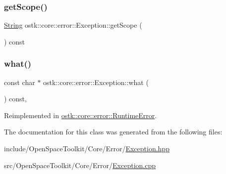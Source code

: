 \subsubsection{\texorpdfstring{get\+Scope()}{getScope()}}
{\footnotesize\ttfamily \hyperlink{classostk_1_1core_1_1types_1_1_string}{String} ostk\+::core\+::error\+::\+Exception\+::get\+Scope (\begin{DoxyParamCaption}{ }\end{DoxyParamCaption}) const}

\mbox{\label{classostk_1_1core_1_1error_1_1_exception_ae34ebc20a97277da6e2472b6bb8e3812}} 
\subsubsection{\texorpdfstring{what()}{what()}}
{\footnotesize\ttfamily const char $\ast$ ostk\+::core\+::error\+::\+Exception\+::what (\begin{DoxyParamCaption}{ }\end{DoxyParamCaption}) const\hspace{0.3cm}{\ttfamily [virtual]}, {\ttfamily [noexcept]}}



Reimplemented in \hyperlink{classostk_1_1core_1_1error_1_1_runtime_error_a671d71ab5483eaa1ce5cc3400747ded1}{ostk\+::core\+::error\+::\+Runtime\+Error}.



The documentation for this class was generated from the following files\+:\begin{DoxyCompactItemize}
\item 
include/\+Open\+Space\+Toolkit/\+Core/\+Error/\hyperlink{_exception_8hpp}{Exception.\+hpp}\item 
src/\+Open\+Space\+Toolkit/\+Core/\+Error/\hyperlink{_exception_8cpp}{Exception.\+cpp}\end{DoxyCompactItemize}

